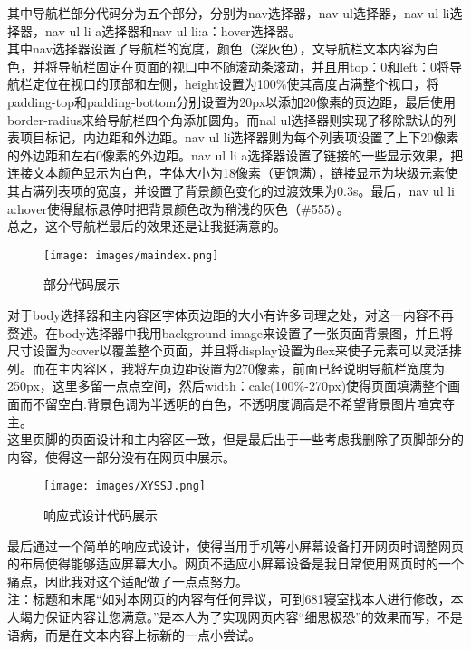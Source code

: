 \documentclass[supercite]{Experimental_Report}
\theoremstyle{definition}
\begin{document}
其中导航栏部分代码分为五个部分，分别为nav选择器，nav ul选择器，nav ul li选择器，nav ul li a选择器和nav ul li:a：hover选择器。\\  其中nav选择器设置了导航栏的宽度，颜色（深灰色），文导航栏文本内容为白色，并将导航栏固定在页面的视口中不随滚动条滚动，并且用top：0和left：0将导航栏定位在视口的顶部和左侧，height设置为100\%使其高度占满整个视口，将padding-top和padding-bottom分别设置为20px以添加20像素的页边距，最后使用border-radius来给导航栏四个角添加圆角。而nal ul选择器则实现了移除默认的列表项目标记，内边距和外边距。nav ul li选择器则为每个列表项设置了上下20像素的外边距和左右0像素的外边距。nav ul li a选择器设置了链接的一些显示效果，把连接文本颜色显示为白色，字体大小为18像素（更饱满），链接显示为块级元素使其占满列表项的宽度，并设置了背景颜色变化的过渡效果为0.3s。最后，nav ul li a:hover使得鼠标悬停时把背景颜色改为稍浅的灰色（\#555）。\\  总之，这个导航栏最后的效果还是让我挺满意的。
\begin{figure}[h]
	\begin{center}
		\texttt{[image: images/maindex.png]}
		\caption{部分代码展示}
		\label{fig2-2}
	\end{center}
\end{figure}
对于body选择器和主内容区字体页边距的大小有许多同理之处，对这一内容不再赘述。在body选择器中我用background-image来设置了一张页面背景图，并且将尺寸设置为cover以覆盖整个页面，并且将display设置为flex来使子元素可以灵活排列。而在主内容区，我将左页边距设置为270像素，前面已经说明导航栏宽度为250px，这里多留一点点空间，然后width：calc(100\%-270px)使得页面填满整个画面而不留空白.背景色调为半透明的白色，不透明度调高是不希望背景图片喧宾夺主。
\\  这里页脚的页面设计和主内容区一致，但是最后出于一些考虑我删除了页脚部分的内容，使得这一部分没有在网页中展示。
\begin{figure}[h]
	\begin{center}
		\texttt{[image: images/XYSSJ.png]}
		\caption{响应式设计代码展示}
		\label{fig2-3}
	\end{center}
\end{figure}
最后通过一个简单的响应式设计，使得当用手机等小屏幕设备打开网页时调整网页的布局使得能够适应屏幕大小。网页不适应小屏幕设备是我日常使用网页时的一个痛点，因此我对这个适配做了一点点努力。
\\注：标题和末尾“如对本网页的内容有任何异议，可到681寝室找本人进行修改，本人竭力保证内容让您满意。”是本人为了实现网页内容“细思极恐”的效果而写，不是语病，而是在文本内容上标新的一点小尝试。
\newpage
\end{document}

